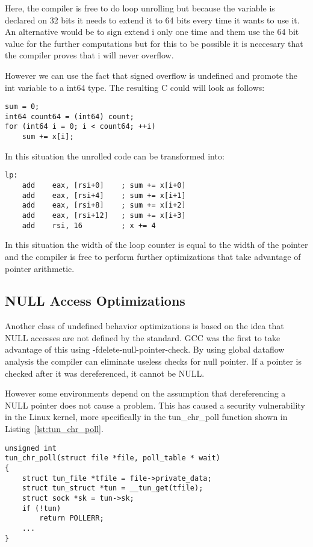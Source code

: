 Here, the compiler is free to do loop unrolling but because the variable
is declared on 32 bits it needs to extend it to 64 bits every time it
wants to use it. An alternative would be to sign extend i only one time
and them use the 64 bit value for the further computations but for this
to be possible it is neccesary that the compiler proves that i will
never overflow.

However we can use the fact that signed overflow is undefined and
promote the int variable to a int64 type. The resulting C could will
look as follows:
\begin{lstlisting}[style=Cstyle, caption={}, label={}]
sum = 0;
int64 count64 = (int64) count;
for (int64 i = 0; i < count64; ++i)
	sum += x[i];
\end{lstlisting}

In this situation the unrolled code can be transformed into:
\begin{lstlisting}[style=Cstyle, caption={}, label={}]
  lp:
    add    eax, [rsi+0]    ; sum += x[i+0]
    add    eax, [rsi+4]    ; sum += x[i+1]
    add    eax, [rsi+8]    ; sum += x[i+2]
    add    eax, [rsi+12]   ; sum += x[i+3]
    add    rsi, 16         ; x += 4
\end{lstlisting}

In this situation the width of the loop counter is equal to the width of
the pointer and the compiler is free to perform further optimizations
that take advantage of pointer arithmetic.

\subsection{NULL Access Optimizations}
Another class of undefined behavior optimizations is based on the idea
that NULL accesses are not defined by the standard. GCC was the first to
take advantage of this using -fdelete-null-pointer-check. By using
global dataflow analysis the compiler can eliminate useless checks for
null pointer. If a pointer is checked after it was dereferenced, it
cannot be NULL.

However some environments depend on the assumption that dereferencing a
NULL pointer does not cause a problem. This has caused a security
vulnerability in the Linux kernel, more specifically in the tun_chr_poll
function shown in Listing~\ref{lst:tun_chr_poll}.
\begin{lstlisting}[style=Cstyle, caption={tun_chr_poll in
drivers/net/tun.c of the Linux kernel}, label={lst:tun_chr_poll}]
unsigned int
tun_chr_poll(struct file *file, poll_table * wait)
{
	struct tun_file *tfile = file->private_data;
	struct tun_struct *tun = __tun_get(tfile);
	struct sock *sk = tun->sk;
	if (!tun)
		return POLLERR;
	...
}
\end{lstlisting}

